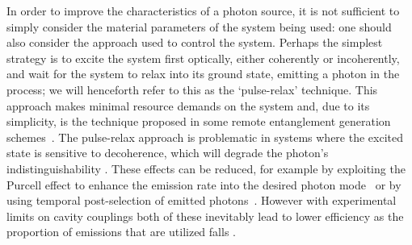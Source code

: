 In order to improve the characteristics of a photon source, it is not sufficient to simply consider the material parameters of the system being used: one should also consider the approach used to control the system. Perhaps the simplest strategy is to excite the system first optically, either coherently or incoherently, and wait for the system to relax into its ground state, emitting a photon in the process; we will henceforth refer to this as the `pulse-relax' technique. %
This approach makes minimal resource demands on the system and, due to its simplicity, is the technique proposed in some remote entanglement generation schemes~\cite{barrett+kok,simon:03}. The pulse-relax approach is problematic in systems where the excited state is sensitive to decoherence, which will degrade the photon's indistinguishability \cite{kiraz:2004, santori:2009, barrett+kok, nazir09}. These effects can be reduced, for example by exploiting the Purcell effect to enhance the emission rate into the desired photon mode~\cite{purcell46,englund05} or by using temporal post-selection of emitted photons~\cite{nazir09}. However with experimental limits on cavity couplings both of these inevitably lead to lower efficiency as the proportion of emissions that are utilized falls \cite{auffeves:prb:10}.

